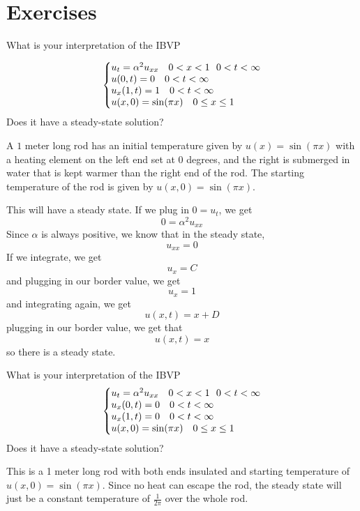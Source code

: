 \documentclass{article}
\begin{document}
\section{Exercises}

\begin{exercise}
What is your interpretation of the IBVP

$$\left\{\begin{array}{@{}l@{}} u_t = \alpha^2u_{xx} \ \ \ 0<x<1 \ \ 0<t<\infty \\u(0,t) = 0 \ \ \ 0<t<\infty \\ u_x(1,t) = 1 \ \ \ 0<t<\infty \\ u(x,0) = \sin (\pi x ) \ \ \ 0\leq x \leq 1 \end{array}\right.$$Does it have a steady-state solution?
\end{exercise}

\begin{solution}
A $1$ meter long rod has an initial temperature given by $u(x) = \sin(\pi x)$ with a heating element on the left end set at $0$ degrees, and the right is submerged in water that is kept warmer than the right end of the rod. The starting temperature of the rod is given by $u(x,0) = \sin(\pi x)$.

This will have a steady state. If we plug in $0 = u_t$, we get $$0 = \alpha^2 u_{xx}$$Since $\alpha$ is always positive, we know that in the steady state, $$u_{xx} = 0$$If we integrate, we get $$u_x = C$$and plugging in our border value, we get $$u_x = 1$$and integrating again, we get $$u(x,t) = x + D$$plugging in our border value, we get that $$u(x,t) = x$$so there is a steady state.
\end{solution}
\begin{exercise}
What is your interpretation of the IBVP$$\left\{\begin{array}{@{}l@{}} u_t = \alpha^2u_{xx} \ \ \ 0<x<1 \ \ 0<t<\infty \\u_x(0,t) = 0 \ \ \ 0<t<\infty \\ u_x(1,t) = 0 \ \ \ 0<t<\infty \\ u(x,0) = \sin (\pi x ) \ \ \ 0\leq x \leq 1 \end{array}\right.$$Does it have a steady-state solution?
\end{exercise}

\begin{solution}
This is a 1 meter long rod with both ends insulated and starting temperature of $u(x,0) = \sin(\pi x)$. Since no heat can escape the rod, the steady state will just be a constant temperature of $\frac{1}{2\pi}$ over the whole rod. 
\end{solution}
\end{document}
